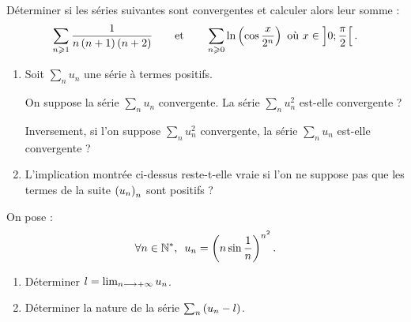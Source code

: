 \begin{corr}
\end{corr}

\begin{exo}[Exercice 2]
Déterminer si les séries suivantes sont convergentes et calculer alors leur somme : \[\sum_{n\geqslant1}\dfrac{1}{n\left(n+1\right)\left(n+2\right)}\qquad\text{et}\qquad\sum_{n\geqslant0}\ln\left(\cos\dfrac{x}{2^n}\right)\text{ où }x\in\left]0;\dfrac{\pi}{2}\right[.\]
\end{exo}

\begin{corr}
\end{corr}

\begin{exo}
\begin{enumerate}
\item Soit \(\sum_nu_n\) une série à termes positifs.

On suppose la série \(\sum_nu_n\) convergente. La série \(\sum_nu_n^2\) est-elle convergente ?

Inversement, si l'on suppose \(\sum_nu_n^2\) convergente, la série \(\sum_nu_n\) est-elle convergente ? \\

\item L'implication montrée ci-dessus reste-t-elle vraie si l'on ne suppose pas que les termes de la suite \(\left(u_n\right)_n\) sont positifs ?
\end{enumerate}
\end{exo}

\begin{corr}
\end{corr}

\begin{exo}
On pose : \[\quantifs{\forall n\in\Ns}u_n=\paren{n\sin\dfrac{1}{n}}^{n^2}.\]

\begin{enumerate}
\item Déterminer \(l=\lim_{n\longrightarrow+\infty}u_n\). \\

\item Déterminer la nature de la série \(\sum_n\left(u_n-l\right)\).
\end{enumerate}
\end{exo}

\begin{corr}
\end{corr}


